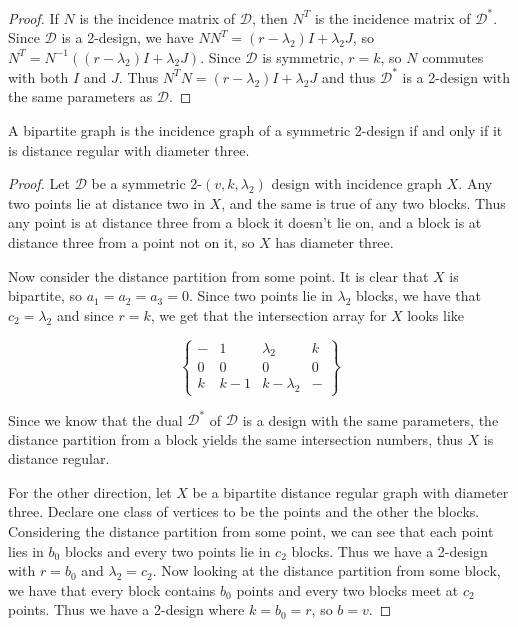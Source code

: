 \begin{proof}
	If $N$ is the incidence matrix of $\mathcal{D}$, then $N^T$ is the incidence matrix of $\mathcal{D}^*$.  Since $\mathcal{D}$ is a 2-design, we have $NN^T=(r-\lambda_2)I+\lambda_2 J$, so $N^T=N^{-1}((r-\lambda_2)I+\lambda_2 J)$.  Since $\mathcal{D}$ is symmetric, $r=k$, so $N$ commutes with both $I$ and $J$.  Thus $N^TN=(r-\lambda_2)I+\lambda_2 J$ and thus $\mathcal{D}^*$ is a 2-design with the same parameters as $\mathcal{D}$.
\end{proof}
\begin{theorem}
	A bipartite graph is the incidence graph of a symmetric 2-design if and only if it is distance regular with diameter three.
\end{theorem}
\begin{proof}
	
	
Let $\mathcal{D}$ be a symmetric 2-$(v,k,\lambda_2)$ design with incidence graph $X$.  Any two points lie at distance two in $X$, and the same is true of any two blocks.	Thus any point is at distance three from a block it doesn't lie on, and a block is at distance three from a point not on it, so $X$ has diameter three.

Now consider the distance partition from some point.  It is clear that $X$ is bipartite, so $a_1=a_2=a_3=0$.  Since two points lie in $\lambda_2$ blocks, we have that $c_2=\lambda_2$ and since $r=k$, we get that the intersection array for $X$ looks like

$$\begin{Bmatrix}
-&1&\lambda_2&k\\
0&0&0&0\\
k&k-1&k-\lambda_2&-
\end{Bmatrix}$$

Since we know that the dual $\mathcal{D}^*$ of $\mathcal{D}$ is a design with the same parameters, the distance partition from a block yields the same intersection numbers, thus $X$ is distance regular.

For the other direction, let $X$ be a bipartite distance regular graph with diameter three.  Declare one class of vertices to be the points and the other the blocks.  Considering the distance partition from some point, we can see that each point lies in $b_0$ blocks and every two points lie in $c_2$ blocks.  Thus we have  a  2-design with $r=b_0$ and $\lambda_2=c_2$.  Now looking at the distance partition from some block, we have that every block contains $b_0$ points and every two blocks meet at $c_2$ points.  Thus we have a 2-design where $k=b_0=r$, so $b=v$.
	
	
	
\end{proof}


